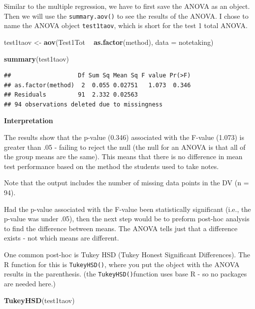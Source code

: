 \documentclass[
]{book}
\newenvironment{Shaded}{\begin{snugshade}}{\end{snugshade}}
\newcommand{\DataTypeTok}[1]{\textcolor[rgb]{0.13,0.29,0.53}{#1}}
\newcommand{\KeywordTok}[1]{\textcolor[rgb]{0.13,0.29,0.53}{\textbf{#1}}}
\newcommand{\NormalTok}[1]{#1}
\newcommand{\OperatorTok}[1]{\textcolor[rgb]{0.81,0.36,0.00}{\textbf{#1}}}
\newcommand{\StringTok}[1]{\textcolor[rgb]{0.31,0.60,0.02}{#1}}
\begin{document}
Similar to the multiple regression, we have to first save the ANOVA as an object. Then we will use the \texttt{summary.aov()} to see the results of the ANOVA. I chose to name the ANOVA object \texttt{test1taov}, which is short for the test 1 total ANOVA.

\begin{Shaded}
\begin{Highlighting}[]
\NormalTok{test1taov <-}\StringTok{ }\KeywordTok{aov}\NormalTok{(Test1Tot }\OperatorTok{~}\StringTok{ }\KeywordTok{as.factor}\NormalTok{(method), }\DataTypeTok{data =}\NormalTok{ notetaking)}

\KeywordTok{summary}\NormalTok{(test1taov)}
\end{Highlighting}
\end{Shaded}

\begin{verbatim}
##                   Df Sum Sq Mean Sq F value Pr(>F)
## as.factor(method)  2  0.055 0.02751   1.073  0.346
## Residuals         91  2.332 0.02563               
## 94 observations deleted due to missingness
\end{verbatim}

\textbf{Interpretation}

The results show that the p-value (0.346) associated with the F-value (1.073) is greater than .05 - failing to reject the null (the null for an ANOVA is that all of the group means are the same). This means that there is no difference in mean test performance based on the method the students used to take notes.

Note that the output includes the number of missing data points in the DV (n = 94).

Had the p-value associated with the F-value been statistically significant (i.e., the p-value was under .05), then the next step would be to preform post-hoc analysis to find the difference between means. The ANOVA tells just that a difference exists - not which means are different.

One common post-hoc is Tukey HSD (Tukey Honest Significant Differences). The R function for this is \texttt{TukeyHSD()}, where you put the object with the ANOVA results in the parenthesis. (the \texttt{TukeyHSD()}function uses base R - so no packages are needed here.)

\begin{Shaded}
\begin{Highlighting}[]
\KeywordTok{TukeyHSD}\NormalTok{(test1taov)}
\end{Highlighting}
\end{Shaded}
\end{document}
